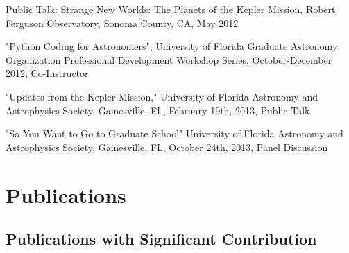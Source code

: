 \documentclass[12pt,letterpaper,sans]{moderncv} %
\begin{document}
Public Talk: Strange New Worlds: The Planets of the Kepler Mission, Robert Ferguson Observatory, Sonoma County, CA, May 2012


"Python Coding for Astronomers", University of Florida Graduate Astronomy Organization Professional Development Workshop Series, October-December 2012, Co-Instructor

"Updates from the Kepler Mission," University of Florida Astronomy and Astrophysics Society, Gainesville, FL, February 19th, 2013, Public Talk

"So You Want to Go to Graduate School" University of Florida Astronomy and Astrophysics Society, Gainesville, FL, October 24th, 2013, Panel Discussion



%

\newpage
\section{Publications}
\subsection{Publications with Significant Contribution}
\end{document}
